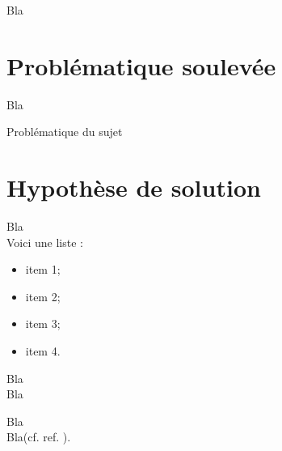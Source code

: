 Bla

\newpage

\section{Problématique soulevée}

Bla

\begin{center}
Problématique du sujet
\end{center}

\section{Hypothèse de solution}

Bla\\

Voici une liste :
\begin{itemize}
\item item 1;
\item item 2;
\item item 3;
\item item 4.
\end{itemize}

Bla\\

Bla

Bla\footnotemark\\

Bla(cf. ref. \cite{cite6}).

